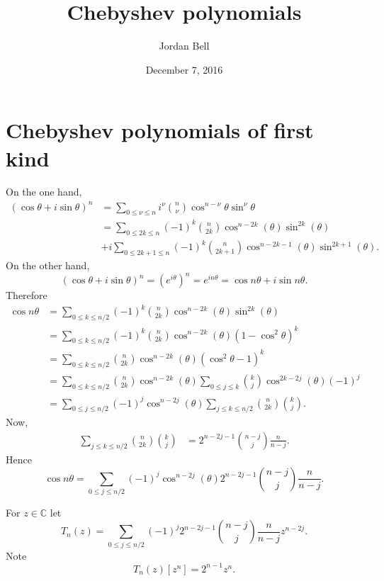 \documentclass{article}
\theoremstyle{definition}
\theoremstyle{definition}
\begin{document}
\title{Chebyshev polynomials}
\author{Jordan Bell}
\date{December 7, 2016}

\maketitle

\section{Chebyshev polynomials of first kind}
On the one hand, 
\begin{align*}
(\cos \theta + i \sin \theta)^n&=\sum_{0 \leq \nu \leq n} i^\nu \binom{n}{\nu} \cos^{n-\nu} \theta \sin^\nu \theta\\
&=\sum_{0 \leq 2k \leq n} (-1)^k \binom{n}{2k}\cos^{n-2k}(\theta) \sin^{2k}(\theta)\\
&+i\sum_{0 \leq 2k+1 \leq n}  (-1)^k \binom{n}{2k+1}\cos^{n-2k-1}(\theta) \sin^{2k+1}(\theta).
\end{align*}
On the other hand,
\[
(\cos \theta+i\sin \theta)^n = (e^{i\theta})^n = e^{in\theta} = \cos n\theta + i\sin n\theta.
\]
Therefore
\begin{align*}
\cos n\theta&=\sum_{0 \leq k \leq n/2} (-1)^k \binom{n}{2k}\cos^{n-2k}(\theta) \sin^{2k}(\theta)\\
&=\sum_{0 \leq k \leq n/2} (-1)^k \binom{n}{2k}\cos^{n-2k}(\theta) (1-\cos^2 \theta)^k\\
&=\sum_{0 \leq k \leq n/2} \binom{n}{2k}\cos^{n-2k}(\theta) (\cos^2 \theta-1)^k\\
&=\sum_{0 \leq k \leq n/2} \binom{n}{2k}\cos^{n-2k}(\theta) \sum_{0 \leq j \leq k} \binom{k}{j} \cos^{2k-2j}(\theta)  (-1)^j\\
&=\sum_{0 \leq j \leq n/2} (-1)^j \cos^{n-2j}(\theta) \sum_{j \leq k \leq n/2} \binom{n}{2k} \binom{k}{j}.
\end{align*}
Now,
\begin{align*}
\sum_{j \leq k \leq n/2} \binom{n}{2k} \binom{k}{j}&=
2^{n-2j-1} \binom{n-j}{j} \frac{n}{n-j}.
\end{align*}
Hence
\[
\cos n\theta = \sum_{0 \leq j \leq n/2} (-1)^j \cos^{n-2j}(\theta)2^{n-2j-1} \binom{n-j}{j} \frac{n}{n-j}.
\]

For $z \in \mathbb{C}$ let 
\begin{equation}
T_n(z) =  \sum_{0 \leq j \leq n/2} (-1)^j 2^{n-2j-1} \binom{n-j}{j} \frac{n}{n-j} z^{n-2j}.
\label{Tn}
\end{equation}
Note
\[
T_n(z)[z^n] = 2^{n-1} z^n.
\]
\end{document}
